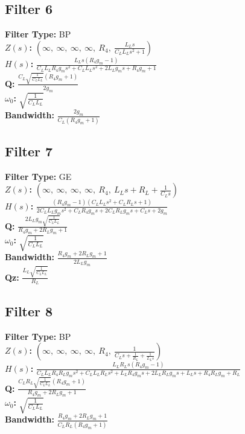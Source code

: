 \documentclass{article}
\begin{document}
\subsection*{Filter 6}
\textbf{Filter Type:} BP \\ 
\textbf{$Z(s)$:} $\left( \infty, \  \infty, \  \infty, \  \infty, \  R_{4}, \  \frac{L_{L} s}{C_{L} L_{L} s^{2} + 1}\right)$ \\ 
\textbf{$H(s)$:} $\frac{L_{L} s \left(R_{4} g_{m} - 1\right)}{C_{L} L_{L} R_{4} g_{m} s^{2} + C_{L} L_{L} s^{2} + 2 L_{L} g_{m} s + R_{4} g_{m} + 1}$ \\ 
\textbf{Q:} $\frac{C_{L} \sqrt{\frac{1}{C_{L} L_{L}}} \left(R_{4} g_{m} + 1\right)}{2 g_{m}}$ \\ 
\textbf{$\omega_0$:} $\sqrt{\frac{1}{C_{L} L_{L}}}$ \\ 
\textbf{Bandwidth:} $\frac{2 g_{m}}{C_{L} \left(R_{4} g_{m} + 1\right)}$ \\ 
\subsection*{Filter 7}
\textbf{Filter Type:} GE \\ 
\textbf{$Z(s)$:} $\left( \infty, \  \infty, \  \infty, \  \infty, \  R_{4}, \  L_{L} s + R_{L} + \frac{1}{C_{L} s}\right)$ \\ 
\textbf{$H(s)$:} $\frac{\left(R_{4} g_{m} - 1\right) \left(C_{L} L_{L} s^{2} + C_{L} R_{L} s + 1\right)}{2 C_{L} L_{L} g_{m} s^{2} + C_{L} R_{4} g_{m} s + 2 C_{L} R_{L} g_{m} s + C_{L} s + 2 g_{m}}$ \\ 
\textbf{Q:} $\frac{2 L_{L} g_{m} \sqrt{\frac{1}{C_{L} L_{L}}}}{R_{4} g_{m} + 2 R_{L} g_{m} + 1}$ \\ 
\textbf{$\omega_0$:} $\sqrt{\frac{1}{C_{L} L_{L}}}$ \\ 
\textbf{Bandwidth:} $\frac{R_{4} g_{m} + 2 R_{L} g_{m} + 1}{2 L_{L} g_{m}}$ \\ 
\textbf{Qz:} $\frac{L_{L} \sqrt{\frac{1}{C_{L} L_{L}}}}{R_{L}}$ \\ 
\subsection*{Filter 8}
\textbf{Filter Type:} BP \\ 
\textbf{$Z(s)$:} $\left( \infty, \  \infty, \  \infty, \  \infty, \  R_{4}, \  \frac{1}{C_{L} s + \frac{1}{R_{L}} + \frac{1}{L_{L} s}}\right)$ \\ 
\textbf{$H(s)$:} $\frac{L_{L} R_{L} s \left(R_{4} g_{m} - 1\right)}{C_{L} L_{L} R_{4} R_{L} g_{m} s^{2} + C_{L} L_{L} R_{L} s^{2} + L_{L} R_{4} g_{m} s + 2 L_{L} R_{L} g_{m} s + L_{L} s + R_{4} R_{L} g_{m} + R_{L}}$ \\ 
\textbf{Q:} $\frac{C_{L} R_{L} \sqrt{\frac{1}{C_{L} L_{L}}} \left(R_{4} g_{m} + 1\right)}{R_{4} g_{m} + 2 R_{L} g_{m} + 1}$ \\ 
\textbf{$\omega_0$:} $\sqrt{\frac{1}{C_{L} L_{L}}}$ \\ 
\textbf{Bandwidth:} $\frac{R_{4} g_{m} + 2 R_{L} g_{m} + 1}{C_{L} R_{L} \left(R_{4} g_{m} + 1\right)}$ \\ 
\end{document}
